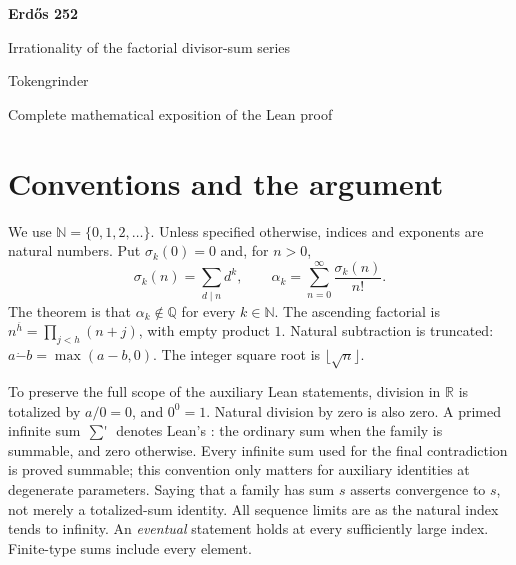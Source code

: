 \documentclass[11pt,a4paper]{article}
\newcommand{\decl}[1]{\texttt{\detokenize{#1}}}
\newcommand{\N}{\mathbb{N}}
\newcommand{\Q}{\mathbb{Q}}
\newcommand{\R}{\mathbb{R}}
\newcommand{\asc}[2]{#1^{\overline{#2}}}
\newcommand{\tsum}{\mathop{\sum\nolimits'}\limits}
\providecommand{\dotminus}{\dot{-}}
\begin{document}
\begin{center}
  {\LARGE\bfseries Erd\H{o}s 252}\par\medskip
  {\Large Irrationality of the factorial divisor-sum series}\par\bigskip
  {\large Tokengrinder}\par\medskip
  Complete mathematical exposition of the Lean proof
\end{center}

\begin{abstract}
For every natural number $k$, the series $\sum_{n\geq1}\sigma_k(n)/n!$
is irrational. Rationality would make its factorial-scaled tails eventually
integral. A fixed finite grid of pairwise coprime dilations cancels the lower
orders in an exact Stirling expansion. The remaining divisor-phase sum
would tend to zero on an arithmetic progression, whereas two fresh-prime
refinements of its progression mean give incompatible limits. Degree zero
is settled separately by positivity and decay of the actual tail.

This document states and proves every named theorem and lemma, including
private lemmas, in \decl{Erdos252/Solution.lean}, and records every local
definition. The final section also covers all six statement-audit theorems.
The typewritten identifier below each lemma title is its exact Lean name
in the \decl{Erdos252} namespace, except in the audit section.
Mathlib results used as standard prerequisites are identified in the text;
the library itself is not reproduced here. The Lean source, not this
exposition, is the kernel-checked artifact.
\end{abstract}

\tableofcontents
\newpage

\section{Conventions and the argument}

We use $\N=\{0,1,2,\ldots\}$. Unless specified otherwise, indices and
exponents are natural numbers. Put $\sigma_k(0)=0$ and, for $n>0$,
\[
  \sigma_k(n)=\sum_{d\mid n}d^k,\qquad
  \alpha_k=\sum_{n=0}^{\infty}\frac{\sigma_k(n)}{n!}.
\]
The theorem is that $\alpha_k\notin\Q$ for every $k\in\N$.
The ascending factorial is $\asc{n}{h}=\prod_{j<h}(n+j)$, with empty
product $1$. Natural subtraction is truncated:
$a\mathbin{\dotminus}b=\max(a-b,0)$. The integer square root is
$\lfloor\sqrt n\rfloor$.

To preserve the full scope of the auxiliary Lean statements, division in
$\R$ is totalized by $a/0=0$, and $0^0=1$. Natural division by zero is
also zero. A primed infinite sum $\tsum$ denotes Lean's \decl{tsum}:
the ordinary sum when the family is summable, and zero otherwise.
Every infinite sum used for the final contradiction is proved summable;
this convention only matters for auxiliary identities at degenerate
parameters. Saying that a family has sum $s$ asserts convergence to $s$,
not merely a totalized-sum identity. All sequence limits are as the natural
index tends to infinity. An \emph{eventual} statement holds at every
sufficiently large index. Finite-type sums include every element.
\end{document}
